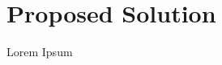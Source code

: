 \documentclass[main.tex]{subfiles}
\begin{document}
\section{Proposed Solution}
Lorem Ipsum
\end{document}
